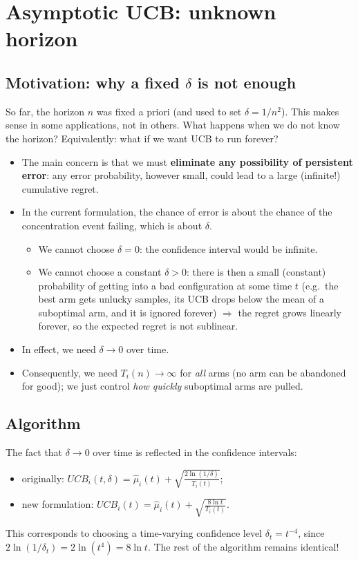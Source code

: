 \section{Asymptotic UCB: unknown horizon}

\subsection{Motivation: why a fixed $\delta$ is not enough}

So far, the horizon $n$ was fixed a priori (and used to set $\delta = 1/n^2$). This makes sense in some applications, not in others. What happens when we do not know the horizon? Equivalently: what if we want UCB to run forever?

\begin{itemize}
    \item The main concern is that we must \textbf{eliminate any possibility of persistent error}: any error probability, however small, could lead to a large (infinite!) cumulative regret.
    \item In the current formulation, the chance of error is about the chance of the concentration event failing, which is about $\delta$.
    \begin{itemize}
        \item We cannot choose $\delta = 0$: the confidence interval would be infinite.
        \item We cannot choose a constant $\delta > 0$: there is then a small (constant) probability of getting into a bad configuration at some time $t$ (e.g.\ the best arm gets unlucky samples, its UCB drops below the mean of a suboptimal arm, and it is ignored forever) $\Rightarrow$ the regret grows linearly forever, so the expected regret is not sublinear.
    \end{itemize}
    \item In effect, we need $\delta \to 0$ over time.
    \item Consequently, we need $T_i(n) \to \infty$ for \emph{all} arms (no arm can be abandoned for good); we just control \emph{how quickly} suboptimal arms are pulled.
\end{itemize}

\subsection{Algorithm}

The fact that $\delta \to 0$ over time is reflected in the confidence intervals:
\begin{itemize}
    \item originally: $UCB_i(t, \delta) = \hat{\mu}_i(t) + \sqrt{\frac{2\ln(1/\delta)}{T_i(t)}}$;
    \item new formulation: $UCB_i(t) = \hat{\mu}_i(t) + \sqrt{\frac{8\ln t}{T_i(t)}}$.
\end{itemize}
This corresponds to choosing a time-varying confidence level $\delta_t = t^{-4}$, since $2\ln(1/\delta_t) = 2\ln(t^4) = 8\ln t$. The rest of the algorithm remains identical!

